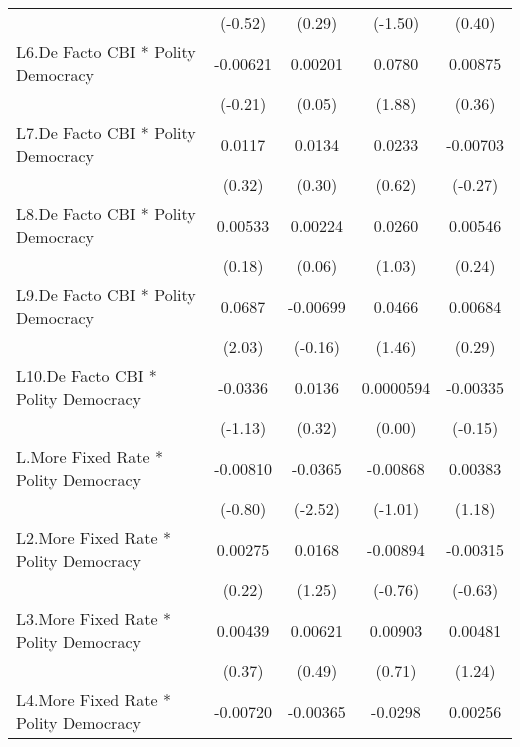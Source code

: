 {\begin{longtable}{l*{4}{c}}
                &  (-0.52)         &   (0.29)         &  (-1.50)         &   (0.40)         \\
\addlinespace
L6.De Facto CBI * Polity Democracy& -0.00621         &  0.00201         &   0.0780         &  0.00875         \\
                &  (-0.21)         &   (0.05)         &   (1.88)         &   (0.36)         \\
\addlinespace
L7.De Facto CBI * Polity Democracy&   0.0117         &   0.0134         &   0.0233         & -0.00703         \\
                &   (0.32)         &   (0.30)         &   (0.62)         &  (-0.27)         \\
\addlinespace
L8.De Facto CBI * Polity Democracy&  0.00533         &  0.00224         &   0.0260         &  0.00546         \\
                &   (0.18)         &   (0.06)         &   (1.03)         &   (0.24)         \\
\addlinespace
L9.De Facto CBI * Polity Democracy&   0.0687\sym{*}  & -0.00699         &   0.0466         &  0.00684         \\
                &   (2.03)         &  (-0.16)         &   (1.46)         &   (0.29)         \\
\addlinespace
L10.De Facto CBI * Polity Democracy&  -0.0336         &   0.0136         &0.0000594         & -0.00335         \\
                &  (-1.13)         &   (0.32)         &   (0.00)         &  (-0.15)         \\
\addlinespace
L.More Fixed Rate * Polity Democracy& -0.00810         &  -0.0365\sym{*}  & -0.00868         &  0.00383         \\
                &  (-0.80)         &  (-2.52)         &  (-1.01)         &   (1.18)         \\
\addlinespace
L2.More Fixed Rate * Polity Democracy&  0.00275         &   0.0168         & -0.00894         & -0.00315         \\
                &   (0.22)         &   (1.25)         &  (-0.76)         &  (-0.63)         \\
\addlinespace
L3.More Fixed Rate * Polity Democracy&  0.00439         &  0.00621         &  0.00903         &  0.00481         \\
                &   (0.37)         &   (0.49)         &   (0.71)         &   (1.24)         \\
\addlinespace
L4.More Fixed Rate * Polity Democracy& -0.00720         & -0.00365         &  -0.0298\sym{*}  &  0.00256         \\

\end{longtable}}
